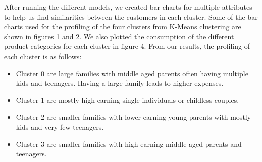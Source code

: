 \documentclass[12pt]{article}
\begin{document}
\noindent After running the different models, we created bar charts for multiple attributes to help us find similarities between the customers in each cluster. Some of the bar charts used for the profiling of the four clusters from K-Means clustering are shown in figures 1 and 2. We also plotted the consumption of the different product categories for each cluster in figure 4. From our results, the profiling of each cluster is as follows:
\begin{center}
    \begin{itemize}
      \item Cluster 0 are large families with middle aged parents often having multiple kids and teenagers. Having a large family leads to higher expenses.
      \item Cluster 1 are mostly high earning single individuals or childless couples.
      \item Cluster 2 are smaller families with lower earning young parents with mostly kids and very few teenagers.
      \item Cluster 3 are smaller families with high earning middle-aged parents and teenagers.
    \end{itemize}
\end{center}
\end{document}
